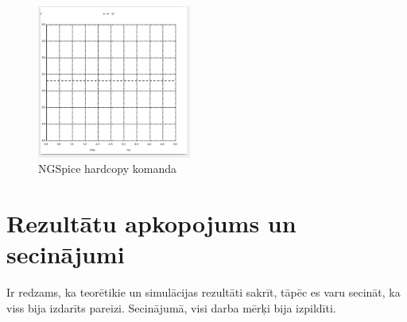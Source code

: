 \documentclass{article}
\begin{document}
        \begin{figure}[H]\centering\includegraphics[width=0.45\textwidth]{pictures/ngspice5.PNG}\caption{NGSpice hardcopy komanda}\label{picture:10lw10p}\end{figure}
    
    \newpage
    \section{Rezultātu apkopojums un secinājumi}
        
        Ir redzams, ka teorētikie un simulācijas rezultāti sakrīt, tāpēc es varu secināt, ka viss bija izdarīts pareizi. Secinājumā, visi darba mērķi bija izpildīti.
\end{document}
